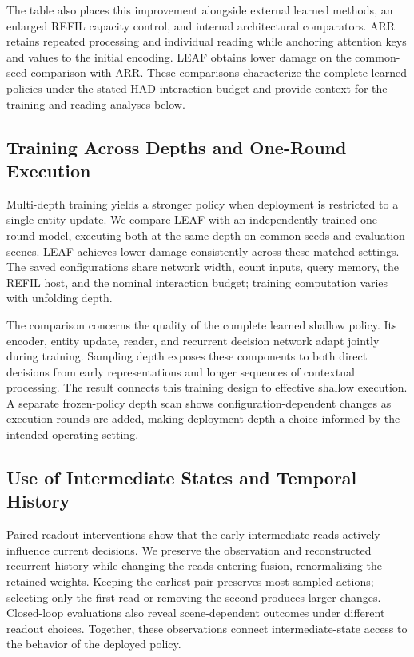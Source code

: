 The table also places this improvement alongside external learned methods, an enlarged REFIL capacity control, and internal architectural comparators. ARR retains repeated processing and individual reading while anchoring attention keys and values to the initial encoding. LEAF obtains lower damage on the common-seed comparison with ARR. These comparisons characterize the complete learned policies under the stated HAD interaction budget and provide context for the training and reading analyses below.




\subsection{Training Across Depths and One-Round Execution}
Multi-depth training yields a stronger policy when deployment is restricted to a single entity update. We compare LEAF with an independently trained one-round model, executing both at the same depth on common seeds and evaluation scenes. LEAF achieves lower damage consistently across these matched settings. The saved configurations share network width, count inputs, query memory, the REFIL host, and the nominal interaction budget; training computation varies with unfolding depth.

The comparison concerns the quality of the complete learned shallow policy. Its encoder, entity update, reader, and recurrent decision network adapt jointly during training. Sampling depth exposes these components to both direct decisions from early representations and longer sequences of contextual processing. The result connects this training design to effective shallow execution. A separate frozen-policy depth scan shows configuration-dependent changes as execution rounds are added, making deployment depth a choice informed by the intended operating setting.

\subsection{Use of Intermediate States and Temporal History}
Paired readout interventions show that the early intermediate reads actively influence current decisions. We preserve the observation and reconstructed recurrent history while changing the reads entering fusion, renormalizing the retained weights. Keeping the earliest pair preserves most sampled actions; selecting only the first read or removing the second produces larger changes. Closed-loop evaluations also reveal scene-dependent outcomes under different readout choices. Together, these observations connect intermediate-state access to the behavior of the deployed policy.


